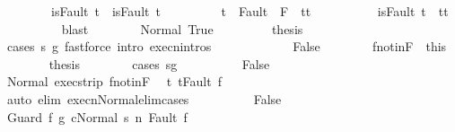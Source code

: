 \begin{isabellebody}
\ \ \ \ \ \ \ \ {\isachardoublequoteopen}isFault\ t\ {\isasymlongrightarrow}\ isFault\ t{\isacharprime}{\isachardoublequoteclose}\ \isanewline
\ \ \ \ \ \ \ \ {\isachardoublequoteopen}t{\isacharprime}\ {\isasymin}\ Fault\ {\isacharbackquote}\ {\isacharparenleft}{\isacharminus}F{\isacharparenright}\ {\isasymlongrightarrow}\ t{\isacharprime}{\isacharequal}t{\isachardoublequoteclose}\ \isanewline
\ \ \ \ \ \ \ \ {\isachardoublequoteopen}{\isasymnot}\ isFault\ t{\isacharprime}\ {\isasymlongrightarrow}\ t{\isacharprime}{\isacharequal}t{\isachardoublequoteclose}\isanewline
\ \ \ \ \ \ \ \ \isamarkupfalse%
\ blast\isanewline
\ \ \ \ \ \ \isamarkupfalse%
\ Normal\ True\ \isanewline
\ \ \ \ \ \ \isamarkupfalse%
\ {\isacharquery}thesis\isanewline
\ \ \ \ \ \ \ \ \isamarkupfalse%
\ {\isacharparenleft}cases\ {\isachardoublequoteopen}s{\isacharprime}{\isasymin}\ g{\isachardoublequoteclose}{\isacharparenright}\ {\isacharparenleft}fastforce\ intro{\isacharcolon}\ execn{\isachardot}intros{\isacharparenright}{\isacharplus}\isanewline
\ \ \ \ \isamarkupfalse%
\isanewline
\ \ \ \ \ \ \isamarkupfalse%
\ False\isanewline
\ \ \ \ \ \ \isamarkupfalse%
\ f{\isacharunderscore}notin{\isacharunderscore}F\ {\isacharequal}\ this\isanewline
\ \ \ \ \ \ \isamarkupfalse%
\ {\isacharquery}thesis\isanewline
\ \ \ \ \ \ \isamarkupfalse%
\ {\isacharparenleft}cases\ {\isachardoublequoteopen}s{\isacharprime}{\isasymin}g{\isachardoublequoteclose}{\isacharparenright}\isanewline
\ \ \ \ \ \ \ \ \isamarkupfalse%
\ False\isanewline
\ \ \ \ \ \ \ \ \isamarkupfalse%
\ Normal\ exec{\isacharunderscore}strip\ f{\isacharunderscore}notin{\isacharunderscore}F\ \isamarkupfalse%
\ t{\isacharcolon}\ {\isachardoublequoteopen}t{\isacharequal}Fault\ f{\isachardoublequoteclose}\isanewline
\ \ \ \ \ \ \ \ \ \ \isamarkupfalse%
\ {\isacharparenleft}auto\ elim{\isacharcolon}\ execn{\isacharunderscore}Normal{\isacharunderscore}elim{\isacharunderscore}cases{\isacharparenright}\isanewline
\ \ \ \ \ \ \ \ \isamarkupfalse%
\ False\isanewline
\ \ \ \ \ \ \ \ \isamarkupfalse%
\ {\isachardoublequoteopen}{\isasymGamma}{\isasymturnstile}{\isasymlangle}Guard\ f\ g\ c{\isacharcomma}Normal\ s{\isacharprime}{\isasymrangle}\ {\isacharequal}n{\isasymRightarrow}\ Fault\ f{\isachardoublequoteclose}\isanewline
\ \ \ \ \ \ \ \ \ \ \isamarkupfalse%

\end{isabellebody}

